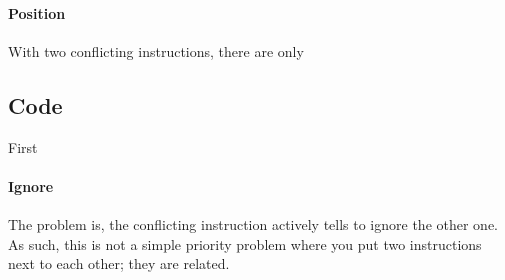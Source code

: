 \paragraph{Position} With two conflicting instructions, there are only 


\subsection{Code}

First


\paragraph{Ignore} The problem is, the conflicting instruction actively tells to
ignore the other one. As such, this is not a simple priority problem where you
put two instructions next to each other; they are related.
